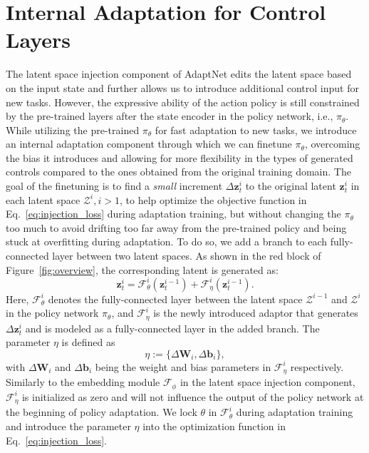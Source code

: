 \section{Internal Adaptation for Control Layers}\label{sec:method_adapt}

The latent space injection component of AdaptNet edits the latent space based on the input state and further allows us to introduce additional control input for new tasks.
However, the expressive ability of the action policy is still constrained by the pre-trained layers after the state encoder in the policy network, i.e., $\pi_\theta$. 
While utilizing the pre-trained $\pi_\theta$ for fast adaptation to new tasks, we introduce an internal adaptation component through which we can finetune $\pi_\theta$, 
overcoming the bias it introduces and allowing for more flexibility in the types of generated controls 
compared to the ones obtained from the original training domain. %
The goal of the %
finetuning is to find a \emph{small} increment $\Delta \mathbf{z}_t^i$ to the original latent $\mathbf{z}_t^i$ in each latent space $\mathcal{Z}^i,  i>1$, %
to help optimize the objective function in Eq.~\ref{eq:injection_loss} during adaptation training, but without changing the $\pi_\theta$ too much 
to avoid drifting too far away from the pre-trained policy and being stuck at overfitting during adaptation. 
To do so, we add a branch to each fully-connected layer between two latent spaces. 
As shown in the red block of Figure~\ref{fig:overview}, the corresponding latent is  generated as:
\begin{equation}\label{eq:adapt_component}
    \mathbf{z}_{t}^i = \mathcal{F}_{\theta}^i (\mathbf{z}_t^{i-1}) + \mathcal{F}_{\eta}^i(\mathbf{z}_t^{i-1}). 
\end{equation}
Here, $\mathcal{F}_{\theta}^i$ denotes the fully-connected layer between the latent space $\mathcal{Z}^{i-1}$ and $\mathcal{Z}^i$ in the policy network $\pi_\theta$, and $\mathcal{F}_{\eta}^i$ is the newly introduced adaptor that generates $\Delta \mathbf{z}_t^i$ and is modeled as a fully-connected layer in the added branch.
The parameter $\eta$ is defined as 
\begin{equation}
\label{eq:eta}
    \eta := \{\Delta\mathbf{W}_i, \Delta\mathbf{b}_i\}, 
\end{equation}
with $\Delta\mathbf{W}_i$ and $\Delta\mathbf{b}_i$ being the weight and bias parameters in $\mathcal{F}_{\eta}^i$ respectively.
Similarly to the embedding module $\mathcal{F}_\phi$ in the latent space injection component,
$\mathcal{F}_{\eta}^i$ is initialized as zero and will not influence the output of the policy network at the beginning of policy adaptation.
We lock $\theta$ in $\mathcal{F}_\theta^i$ during adaptation training and introduce the parameter $\eta$ into the optimization function in Eq.~\ref{eq:injection_loss}.

